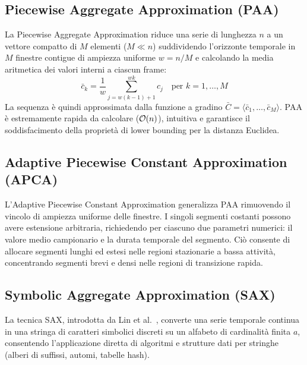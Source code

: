 \FloatBarrier
\subsection{Piecewise Aggregate Approximation (PAA)}
\label{subsec:ts-paa-approximation}

La Piecewise Aggregate Approximation riduce una serie di lunghezza $n$ a un vettore compatto di $M$ elementi ($M \ll n$) suddividendo l'orizzonte temporale in $M$ finestre contigue di ampiezza uniforme $w = n/M$ e calcolando la media aritmetica dei valori interni a ciascun frame:
\begin{equation}
\label{eq:ts-paa-formula}
\bar{c}_k = \frac{1}{w} \sum_{j = w(k-1) + 1}^{w k} c_j \quad \text{per } k = 1, \dots, M
\end{equation}
La sequenza \`e quindi approssimata dalla funzione a gradino $\bar{C} = \langle \bar{c}_1, \dots, \bar{c}_M \rangle$. PAA \`e estremamente rapida da calcolare ($\mathcal{O}\!\left(n\right)$), intuitiva e garantisce il soddisfacimento della propriet\`a di lower bounding per la distanza Euclidea.

\FloatBarrier
\subsection{Adaptive Piecewise Constant Approximation (APCA)}
\label{subsec:ts-apca-approximation}

L'Adaptive Piecewise Constant Approximation generalizza PAA rimuovendo il vincolo di ampiezza uniforme delle finestre. I singoli segmenti costanti possono avere estensione arbitraria, richiedendo per ciascuno due parametri numerici: il valore medio campionario e la durata temporale del segmento. Ci\`o consente di allocare segmenti lunghi ed estesi nelle regioni stazionarie a bassa attivit\`a, concentrando segmenti brevi e densi nelle regioni di transizione rapida.

\FloatBarrier
\subsection{Symbolic Aggregate Approximation (SAX)}
\label{subsec:ts-sax-approximation}

La tecnica SAX, introdotta da Lin et al.~\cite{lin2007}, converte una serie temporale continua in una stringa di caratteri simbolici discreti su un alfabeto di cardinalit\`a finita $a$, consentendo l'applicazione diretta di algoritmi e strutture dati per stringhe (alberi di suffissi, automi, tabelle hash).


